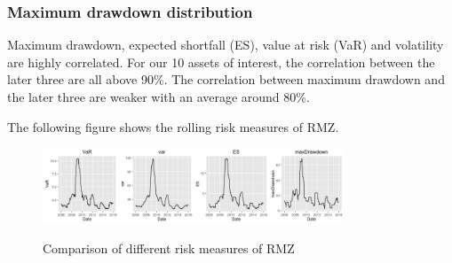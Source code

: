 \documentclass{beamer}
\newcommand\Fontviii{\fontsize{8}{9.2}\selectfont}
\begin{document}

\begin{frame}
\frametitle{Maximum drawdown distribution}
\Fontviii

Maximum drawdown, expected shortfall (ES), value at risk (VaR) and volatility are highly correlated. For our 10 assets of interest, the correlation between the later three are all above 90\%. The correlation between maximum drawdown and the later three are weaker with an average around 80\%. \par
The following figure shows the rolling risk measures of RMZ.


\begin{figure}[h]
\centering 
\includegraphics[width = 0.8\textwidth]{../results/risk_measure_RMZ}
\label{fig: risk_meausre_RMZ}
\caption{Comparison of different risk measures of RMZ} 
\end{figure}

\end{frame}

\end{document}
